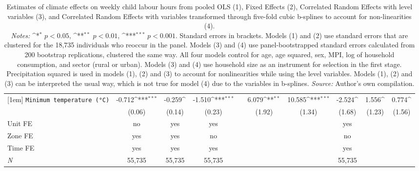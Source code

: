 \documentclass[a4paper,12pt]{article}
\def\sym#1{\ifmmode^{#1}\else\(^{#1}\)\fi}
\theoremstyle{plain}
\theoremstyle{definition}
\theoremstyle{definition}
\theoremstyle{definition}
\theoremstyle{definition}
\begin{document}
\begin{landscape}
\begin{table}[htbp]
\begin{center}
\begin{tabular}{l*{9}{c}}
    [1em]
    \texttt{Minimum temperature (°C)}
    & -0.712\sym{***} & -0.259\sym{}    & -1.510\sym{***} &
    & 6.079\sym{**}  & 10.585\sym{***} & -2.524\sym{}    & 1.556\sym{}     & 0.774\sym{}    \\
    &     (0.06)      &     (0.14)      &     (0.23)      &
    &     (1.92)      &     (1.34)      &     (1.68)      &     (1.23)      &     (1.56)     \\
    [1em]
    \hline
    Unit FE & no  & yes & yes & & & & yes & & \\
    Zone FE & yes & yes & no & & & & no  & & \\
    Time FE & yes & yes & yes & & & & yes  & & \\
    \hline
    \textit{N} & 55,735 & 55,735 & 55,735 & & & & 55,735 & \\
    \hline\hline
    \end{tabular}
\caption*{\footnotesize{Estimates of climate effects on weekly child labour hours from pooled OLS (1), Fixed Effects (2), Correlated Random Effects \citep{wooldridge1995} with level variables (3), and Correlated Random Effects with variables transformed through five-fold cubic b-splines to account for non-linearities (4). \\
\textit{Notes:} \sym{*} \(p<0.05\), \sym{**} \(p<0.01\), \sym{***} \(p<0.001\). Standard errors in brackets. Models (1) and (2) use standard errors that are clustered for the 18,735 individuals who reoccur in the panel. Models (3) and (4) use panel-bootstrapped standard errors calculated from 200 bootstrap replications, clustered the same way. All four models control for age, age squared, sex, MPI, log of household consumption, and sector (rural or urban). Models (3) and (4) use household size as an instrument for selection in the first stage. Precipitation squared is used in models (1), (2) and (3) to account for nonlinearities while using the level variables. Models (1), (2) and (3) can be interpreted the usual way, which is not true for model (4) due to the variables in b-splines. \textit{Source:} Author's own compilation.}}
\end{center}
\end{table}
\end{landscape}
\end{document}
